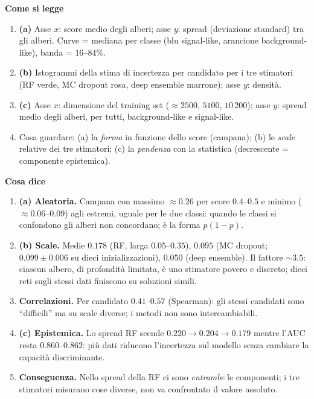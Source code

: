\documentclass[10.5pt,a4paper]{article}
\newcommand{\sez}[1]{\par\Needspace{6\baselineskip}\medskip\noindent\textbf{\large #1}\par\nopagebreak\smallskip}
\begin{document}
\sez{Come si legge}
\begin{enumerate}
\item \textbf{(a)} Asse $x$: score medio degli alberi; asse $y$: spread (deviazione standard) tra gli alberi. Curve = mediana per classe (blu signal-like, arancione background-like), banda = $16$--$84\%$.
\item \textbf{(b)} Istogrammi della stima di incertezza per candidato per i tre stimatori (RF verde, MC dropout rosa, deep ensemble marrone); asse $y$: densità.
\item \textbf{(c)} Asse $x$: dimensione del training set ($\approx2500$, $5100$, $10\,200$); asse $y$: spread medio degli alberi, per tutti, background-like e signal-like.
\item Cosa guardare: (a) la \emph{forma} in funzione dello score (campana); (b) le \emph{scale} relative dei tre stimatori; (c) la \emph{pendenza} con la statistica (decrescente = componente epistemica).
\end{enumerate}

\sez{Cosa dice}
\begin{enumerate}
\item \textbf{(a) Aleatoria.} Campana con massimo $\approx0.26$ per score $0.4$--$0.5$ e minimo ($\approx0.06$--$0.09$) agli estremi, uguale per le due classi: quando le classi si confondono gli alberi non concordano; è la forma $p(1-p)$.
\item \textbf{(b) Scale.} Medie $0.178$ (RF, larga $0.05$--$0.35$), $0.095$ (MC dropout; $0.099\pm0.006$ su dieci inizializzazioni), $0.050$ (deep ensemble). Il fattore $\sim3.5$: ciascun albero, di profondità limitata, è uno stimatore povero e discreto; dieci reti sugli stessi dati finiscono su soluzioni simili.
\item \textbf{Correlazioni.} Per candidato $0.41$--$0.57$ (Spearman): gli stessi candidati sono ``difficili'' ma su scale diverse; i metodi non sono intercambiabili.
\item \textbf{(c) Epistemica.} Lo spread RF scende $0.220\to0.204\to0.179$ mentre l'AUC resta $0.860$--$0.862$: più dati riducono l'incertezza sul modello senza cambiare la capacità discriminante.
\item \textbf{Conseguenza.} Nello spread della RF ci sono \emph{entrambe} le componenti; i tre stimatori misurano cose diverse, non va confrontato il valore assoluto.
\end{enumerate}
\end{document}
